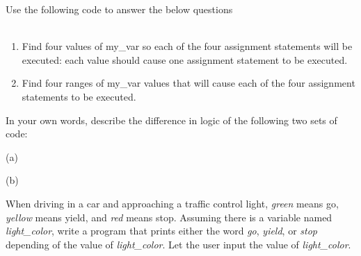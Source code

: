 

	\item  
		Use the following code to answer the below questions\\
		\mbox{ \hspace*{0.25in}	}
		\begin{enumerate}
			\item Find four values of my\_var so each of the four assignment statements will be executed: 
				each value should cause one assignment statement to be executed.
			\item Find four ranges of my\_var values that will cause each of the four assignment 
				statements to be executed.
		\end{enumerate}


	\item  
		In your own words, describe the difference in logic of the following two sets of code:\\
		\begin{minipage}{.5\textwidth}
			(a) \mbox{\hspace*{2em} }
		\end{minipage}
		\begin{minipage}{.5\textwidth}
			(b) \mbox{\hspace*{2em} }
		\end{minipage}


	\item  
		When driving in a car and approaching a traffic control light, \textit{green} means go, 
		\textit{yellow} means yield, and \textit{red} means stop.  Assuming there is a variable 
		named \textit{light\_color}, write a program that prints either the word \textit{go}, 
		\textit{yield}, or \textit{stop} depending of the value of \textit{light\_color}.  
		Let the user input the value of \textit{light\_color}.



